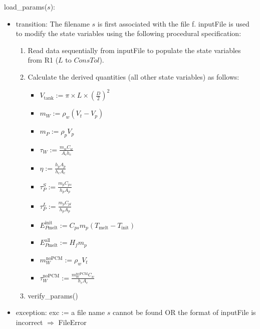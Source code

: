 \documentclass[12pt, titlepage]{article}
\begin{document}
\noindent load\_params($s$):
\begin{itemize}
\item transition: The filename $s$ is first associated with the file f.  {inputFile} is used to
  modify the state variables using the following procedural specification:
\begin{enumerate}
\item Read data sequentially from inputFile to populate the state variables from
  R1 ($L$ to $\mathit{ConsTol}$).
\item Calculate the derived quantities (all other state variables) as follows:
\begin{itemize}
\item $V_{\text{tank}} := \pi \times L \times (\frac{D}{2}) ^ 2$
\item $m_W := \rho_w (V_t - V_p)$
\item $m_P := \rho_p V_p$
\item $\tau_W := \frac{m_w C_w}{A_c h_c}$
\item $\eta := \frac{h_p A_p}{h_c A_c}$
\item $\tau_P^S := \frac{m_p C_{ps}}{h_p A_p}$
\item $\tau_P^L := \frac{m_p C_{pl}}{h_p A_p}$
\item $E_{P\text{melt}}^{\text{init}} := C_{ps} m_p (T_{\text{melt}} - T_{\text{init}})$
\item $E_{P\text{melt}}^{\text{all}} := H_f m_p$
\item $m_W^{\text{noPCM}} := \rho_w  V_t$
\item $\tau_W^{\text{noPCM}} := \frac{m_W^{\text{noPCM}} C_w}{h_c A_c}$
\end{itemize}
\item verify\_params()
\end{enumerate}

\item exception: exc := a file name $s$ cannot be found OR the format of
  inputFile is incorrect $\Rightarrow$  FileError
\end{itemize}
\end{document}
